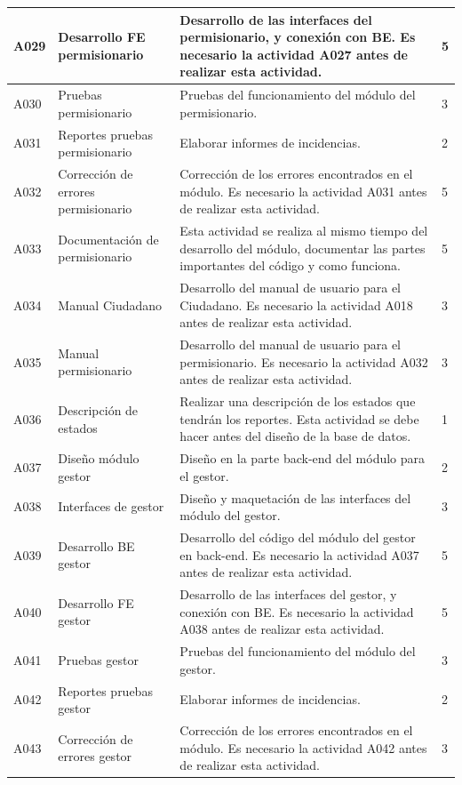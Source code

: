 \documentclass[12pt,twoside]{article}
\begin{document}
\begin{longtable}{|l|m{3cm}|m{6cm}|m{2cm}|}
    A029 & Desarrollo FE permisionario & Desarrollo de las interfaces del permisionario, y conexión con BE. Es necesario la actividad A027 antes de realizar esta actividad. & 5 \\ \hline
    A030 & Pruebas permisionario & Pruebas del funcionamiento del módulo del permisionario. & 3 \\ \hline
    A031 & Reportes pruebas permisionario & Elaborar informes de incidencias. & 2 \\ \hline
    A032 & Corrección de errores permisionario & Corrección de los errores encontrados en el módulo. Es necesario la actividad A031 antes de realizar esta actividad. & 5 \\ \hline
    A033 & Documentación de permisionario & Esta actividad se realiza al mismo tiempo del desarrollo del módulo, documentar las partes importantes del código y como funciona. & 5 \\ \hline
    A034 & Manual Ciudadano & Desarrollo del manual de usuario para el Ciudadano. Es necesario la actividad A018 antes de realizar esta actividad. & 3 \\ \hline
    A035 & Manual permisionario & Desarrollo del manual de usuario para el permisionario. Es necesario la actividad A032 antes de realizar esta actividad. & 3 \\ \hline
    A036 & Descripción de estados & Realizar una descripción de los estados que tendrán los reportes. Esta actividad se debe hacer antes del diseño de la base de datos. & 1 \\ \hline
    A037 & Diseño módulo gestor & Diseño en la parte back-end del módulo para el gestor. & 2 \\ \hline
    A038 & Interfaces de gestor & Diseño y maquetación de las interfaces del módulo del gestor. & 3 \\ \hline
    A039 & Desarrollo BE gestor & Desarrollo del código del módulo del gestor en back-end. Es necesario la actividad A037 antes de realizar esta actividad. & 5 \\ \hline
    A040 & Desarrollo FE gestor & Desarrollo de las interfaces del gestor, y conexión con BE. Es necesario la actividad A038 antes de realizar esta actividad. & 5 \\ \hline
    A041 & Pruebas gestor & Pruebas del funcionamiento del módulo del gestor. & 3 \\ \hline
    A042 & Reportes pruebas gestor & Elaborar informes de incidencias. & 2 \\ \hline
    A043 & Corrección de errores gestor & Corrección de los errores encontrados en el módulo. Es necesario la actividad A042 antes de realizar esta actividad. & 3 \\ \hline

\end{longtable}
\end{document}
